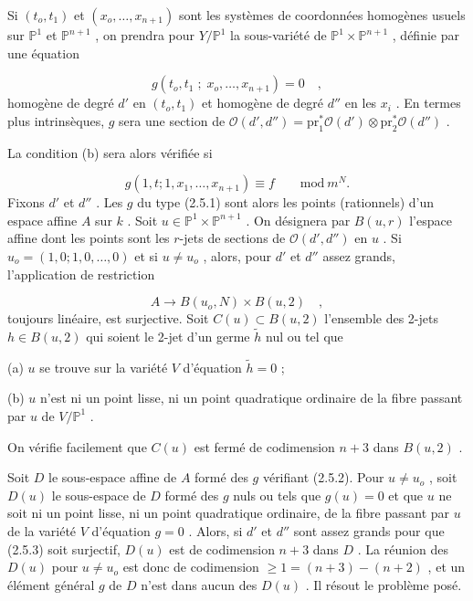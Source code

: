 Si $(t_o,t_1)$ et $(x_o,\ldots,x_{n+1})$ sont les systèmes de coordonnées homogènes usuels sur $\mathbb{P}^1$ et $\mathbb{P}^{n+1}$ , on prendra pour $Y/\mathbb{P}^1$ la sous-variété de $\mathbb{P}^1 \times \mathbb{P}^{n+1}$ , définie par une équation

\begin{equation}\tag{2.5.1}
g(t_o,t_1 \; ; \; x_o,\ldots,x_{n+1}) = 0 \quad ,
\end{equation}
homogène de degré $d'$ en $(t_o,t_1)$ et homogène de degré $d''$ en les $x_i$ . En termes plus intrinsèques, $g$ sera une section de $\mathcal{O}(d',d'') = \mathrm{pr}_1^{*} \mathcal{O}(d') \otimes \mathrm{pr}_2^{*} \mathcal{O}(d'')$ .



La condition (b) sera alors vérifiée si

\begin{equation}\tag{2.5.2}
g(1,t ; 1,x_1,\ldots,x_{n+1}) \equiv f \qquad \mathrm{mod}\ m^N .
\end{equation}
Fixons $d'$ et $d''$ . Les $g$ du type (2.5.1) sont alors les points (rationnels) d'un espace affine $A$ sur $k$ . Soit $u \in \mathbb{P}^1 \times \mathbb{P}^{n+1}$ . On désignera par $B(u,r)$ l'espace affine dont les points sont les $r$-jets de sections de $\mathcal{O}(d',d'')$ en $u$ . Si $u_o = (1,0;1,0,\ldots,0)$ et si $u \neq u_o$ , alors, pour $d'$ et $d''$ assez grands, l'application de restriction

\begin{equation}\tag{2.5.3}
A \to B(u_o,N) \times B(u,2) \quad ,
\end{equation}
toujours linéaire, est surjective. Soit $C(u) \subset B(u,2)$ l'ensemble des 2-jets $h \in B(u,2)$ qui soient le 2-jet d'un germe $\tilde{h}$ nul ou tel que

(a) $u$ se trouve sur la variété $V$ d'équation $\tilde{h} = 0$ ;

(b) $u$ n'est ni un point lisse, ni un point quadratique ordinaire de la fibre passant par $u$ de $V/\mathbb{P}^1$ .

On vérifie facilement que $C(u)$ est fermé de codimension $n + 3$ dans $B(u,2)$ .

Soit $D$ le sous-espace affine de $A$ formé des $g$ vérifiant (2.5.2). Pour $u \neq u_o$ , soit $D(u)$ le sous-espace de $D$ formé des $g$ nuls ou tels que $g(u) = 0$ et que $u$ ne soit ni un point lisse, ni un point quadratique ordinaire, de la fibre passant par $u$ de la variété $V$ d'équation $g = 0$ . Alors, si $d'$ et $d''$ sont assez grands pour que (2.5.3) soit surjectif, $D(u)$ est de codimension $n+3$ dans $D$ . La réunion des $D(u)$ pour $u \neq u_o$ est donc de codimension $\geq 1 = (n+3) - (n+2)$ , et un élément général $g$ de $D$ n'est dans aucun des $D(u)$ . Il résout le problème posé.


